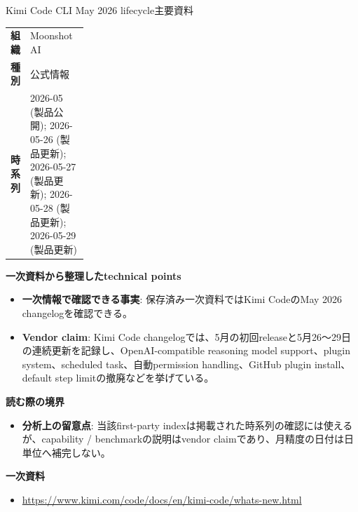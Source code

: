 \begin{technicalnote}{Kimi Code CLI May 2026 lifecycle}{主要資料}
\begingroup
\begin{tabularx}{\linewidth}{@{}>{\bfseries}p{0.22\linewidth}X@{}}
組織 & Moonshot AI \\
種別 & 公式情報 \\
時系列 & 2026-05 (製品公開); 2026-05-26 (製品更新); 2026-05-27 (製品更新); 2026-05-28 (製品更新); 2026-05-29 (製品更新) \\
\end{tabularx}
\smallskip
{\bfseries 一次資料から整理したtechnical points}
\begin{itemize}[leftmargin=1.5em,itemsep=0.35em]
\item \textbf{一次情報で確認できる事実}: 保存済み一次資料ではKimi CodeのMay 2026 changelogを確認できる。
\end{itemize}
\begin{minipage}{\linewidth}
\begin{itemize}[leftmargin=1.5em,itemsep=0.35em]
\item \textbf{Vendor claim}: Kimi Code changelogでは、5月の初回releaseと5月26〜29日の連続更新を記録し、OpenAI-compatible reasoning model support、plugin system、scheduled task、自動permission handling、GitHub plugin install、default step limitの撤廃などを挙げている。
\end{itemize}
{\bfseries 読む際の境界}
\begin{itemize}[leftmargin=1.5em,itemsep=0.35em]
\item \textbf{分析上の留意点}: 当該first-party indexは掲載された時系列の確認には使えるが、capability / benchmarkの説明はvendor claimであり、月精度の日付は日単位へ補完しない。
\end{itemize}
\begin{samepage}
{\bfseries 一次資料}
\begingroup\sloppy
\begin{itemize}[leftmargin=1.5em,itemsep=0.25em]
\item {\scriptsize\url{https://www.kimi.com/code/docs/en/kimi-code/whats-new.html}}
\end{itemize}
\endgroup
\end{samepage}
\end{minipage}
\endgroup
\end{technicalnote}
\medskip

